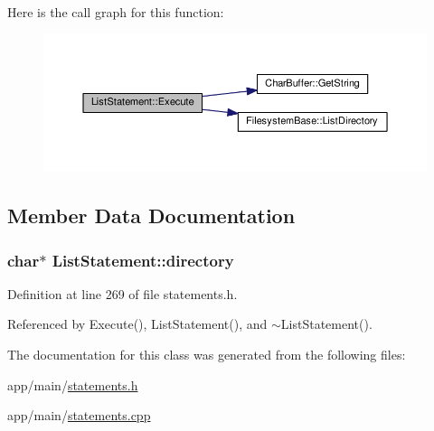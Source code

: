 Here is the call graph for this function\+:
\nopagebreak
\begin{figure}[H]
\begin{center}
\leavevmode
\includegraphics[width=350pt]{d3/dd6/classListStatement_a49cc9fe49b665a1276f288c069e1c78b_cgraph}
\end{center}
\end{figure}




\subsection{Member Data Documentation}
\subsubsection[{\texorpdfstring{directory}{directory}}]{\setlength{\rightskip}{0pt plus 5cm}char$\ast$ List\+Statement\+::directory\hspace{0.3cm}{\ttfamily [private]}}\hypertarget{classListStatement_a248d7a5e3b315fb582dff3cf51e36006}{}\label{classListStatement_a248d7a5e3b315fb582dff3cf51e36006}


Definition at line 269 of file statements.\+h.



Referenced by Execute(), List\+Statement(), and $\sim$\+List\+Statement().



The documentation for this class was generated from the following files\+:\begin{DoxyCompactItemize}
\item 
app/main/\hyperlink{statements_8h}{statements.\+h}\item 
app/main/\hyperlink{statements_8cpp}{statements.\+cpp}\end{DoxyCompactItemize}
